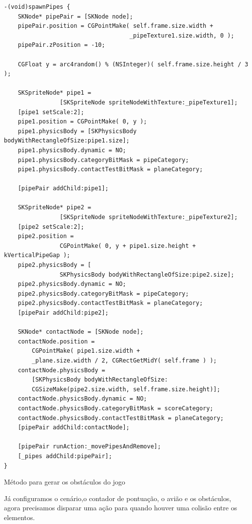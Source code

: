\documentclass[a4paper,12pt,brazil,oneside]{book}
\begin{document}
\begin{listing}[H]
\begin{verbatim}
-(void)spawnPipes {
    SKNode* pipePair = [SKNode node];
    pipePair.position = CGPointMake( self.frame.size.width + 
    								_pipeTexture1.size.width, 0 );
    pipePair.zPosition = -10;
    
    CGFloat y = arc4random() % (NSInteger)( self.frame.size.height / 3 );
    
    SKSpriteNode* pipe1 = 
    			[SKSpriteNode spriteNodeWithTexture:_pipeTexture1];
    [pipe1 setScale:2];
    pipe1.position = CGPointMake( 0, y );
    pipe1.physicsBody = [SKPhysicsBody bodyWithRectangleOfSize:pipe1.size];
    pipe1.physicsBody.dynamic = NO;
    pipe1.physicsBody.categoryBitMask = pipeCategory;
    pipe1.physicsBody.contactTestBitMask = planeCategory;
    
    [pipePair addChild:pipe1];
    
    SKSpriteNode* pipe2 = 
    			[SKSpriteNode spriteNodeWithTexture:_pipeTexture2];
    [pipe2 setScale:2];
    pipe2.position = 
    			CGPointMake( 0, y + pipe1.size.height + kVerticalPipeGap );
    pipe2.physicsBody = [
    			SKPhysicsBody bodyWithRectangleOfSize:pipe2.size];
    pipe2.physicsBody.dynamic = NO;
    pipe2.physicsBody.categoryBitMask = pipeCategory;
    pipe2.physicsBody.contactTestBitMask = planeCategory;
    [pipePair addChild:pipe2];
    
    SKNode* contactNode = [SKNode node];
    contactNode.position = 
    	CGPointMake( pipe1.size.width + 
		_plane.size.width / 2, CGRectGetMidY( self.frame ) );
    contactNode.physicsBody = 
    	[SKPhysicsBody bodyWithRectangleOfSize:
		CGSizeMake(pipe2.size.width, self.frame.size.height)];
    contactNode.physicsBody.dynamic = NO;
    contactNode.physicsBody.categoryBitMask = scoreCategory;
    contactNode.physicsBody.contactTestBitMask = planeCategory;
    [pipePair addChild:contactNode];
    
    [pipePair runAction:_movePipesAndRemove];
    [_pipes addChild:pipePair];
}
\end{verbatim}
\caption{Método para gerar os obstáculos do jogo}
\end{listing}

Já configuramos o cenário,o contador de pontuação, o avião e os obstáculos, agora precisamos disparar uma ação para quando houver uma colisão entre os elementos.
\end{document}

